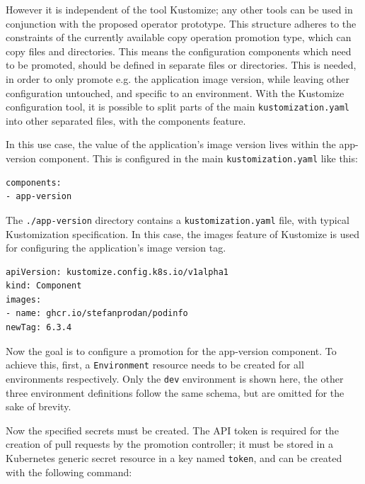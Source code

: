 However it is independent of the tool Kustomize;
any other tools can be used in conjunction with the proposed operator prototype.
This structure adheres to the constraints of the currently available
copy operation promotion type, which can copy files and directories.
This means the configuration components which need to be promoted,
should be defined in separate files or directories.
This is needed, in order to only promote e.g. the application image version,
while leaving other configuration untouched, and specific to an environment.
With the Kustomize configuration tool, it is possible to split
parts of the main \lstinline|kustomization.yaml| into other separated files,
with the components feature.

In this use case, the value of the application's image version lives within the 
app-version component. This is configured in the main \lstinline|kustomization.yaml|
like this:

\begin{lstlisting}
components:
- app-version
\end{lstlisting}

The \lstinline|./app-version| directory contains a \lstinline|kustomization.yaml| file,
with typical Kustomization specification.
In this case, the images feature of Kustomize is used for configuring the application's
image version tag.

\begin{lstlisting}
apiVersion: kustomize.config.k8s.io/v1alpha1
kind: Component
images:
- name: ghcr.io/stefanprodan/podinfo
newTag: 6.3.4
\end{lstlisting}

Now the goal is to configure a promotion for the app-version component.
To achieve this, 
first, a \lstinline|Environment| resource needs to be created
for all environments respectively.
Only the \lstinline|dev| environment is shown here,
the other three environment definitions follow the same schema,
but are omitted for the sake of brevity.



%
%
%
%
%

Now the specified secrets must be created.
The API token is required for the creation of pull requests by the promotion controller;
it must be stored in a Kubernetes generic secret resource in a key named \lstinline|token|,
and can be created with the following command:

